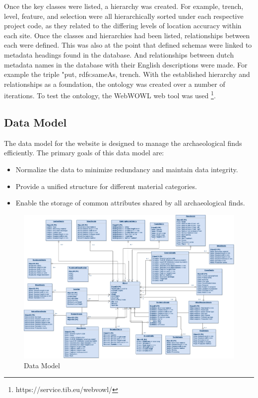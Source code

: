 Once the key classes were listed, a hierarchy was created.  For example, trench, level, feature, and selection were all hierarchically sorted under each respective project code, as they related to the differing levels of location accuracy within each site. Once the classes and hierarchies had been listed, relationships between each were defined.  This was also at the point that defined schemas were linked to metadata headings found in the database. And relationships between dutch metadata names in the database with their English descriptions were made. For example the triple "put, rdfs:sameAs, trench.  With the established hierarchy and relationships as a foundation, the ontology was created over a number of iterations. To test the ontology, the WebWOWL web tool was used \footnote{https://service.tib.eu/webvowl/}.

\subsection{Data Model}

The data model for the website is designed to manage the archaeological finds efficiently. The primary goals of this data model are:

\begin{itemize}
\item Normalize the data to minimize redundancy and maintain data integrity.
\item Provide a unified structure for different material categories.
\item Enable the storage of common attributes shared by all archaeological finds.
\end{itemize}

 \begin{figure}[!]
    \centering
    \includegraphics[width=0.6\paperwidth]{media/final data model.png}
    \caption{Data Model}
    \label{fig:data model}
\end{figure}

